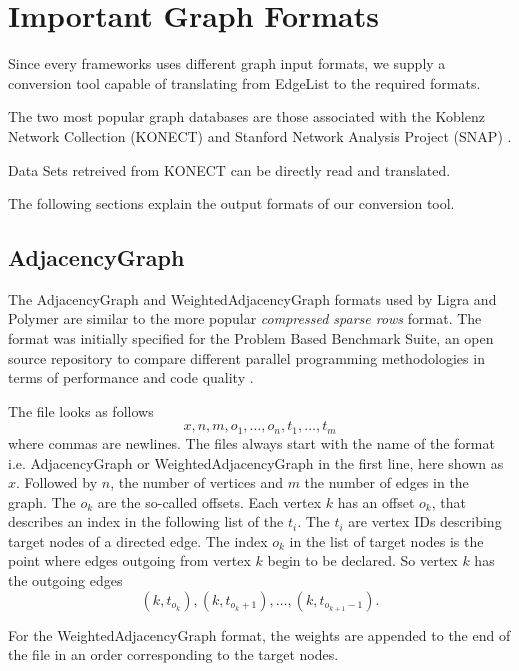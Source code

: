 
\section{Important Graph Formats}
Since every frameworks uses different graph input formats, we supply a conversion tool capable of translating from EdgeList to the required formats.

The two most popular graph databases are those associated with the Koblenz Network Collection (KONECT) \cite{konect} and Stanford Network Analysis Project (SNAP) \cite{snap}.

Data Sets retreived from KONECT can be directly read and translated.


The following sections explain the output formats of our conversion tool.
\subsection{AdjacencyGraph}
The AdjacencyGraph and WeightedAdjacencyGraph formats used by Ligra and Polymer are similar to the more popular \emph{compressed sparse rows} format.
The format was initially specified for the Problem Based Benchmark Suite, an open source repository to compare different parallel programming methodologies in terms of performance and code quality \cite{pbbs}.

The file looks as follows
\begin{equation*}
	x, n, m, o_1, \ldots, o_n, t_1, \ldots, t_m
\end{equation*}
where commas are newlines. The files always start with the name of the format i.e. AdjacencyGraph or WeightedAdjacencyGraph in the first line, here shown as $x$.
Followed by $n$, the number of vertices and $m$ the number of edges in the graph.
The $o_k$ are the so-called offsets. Each vertex $k$ has an offset $o_k$, that describes an index in the following list of the $t_i$.
The $t_i$ are vertex IDs describing target nodes of a directed edge. 
The index $o_k$ in the list of target nodes is the point where edges outgoing from vertex $k$ begin to be declared. So vertex $k$ has the outgoing edges
\begin{equation*}
	(k, t_{o_k}), (k, t_{o_k+1}),\ldots, (k, t_{o_{k+1}-1}).
\end{equation*}

For the WeightedAdjacencyGraph format, the weights are appended to the end of the file in an order corresponding to the target nodes.


